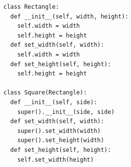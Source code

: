 \documentclass[calcdimensions,landscape,letterpaper]{powersem}
\newcommand{\thecurrentheading}{}
\newcommand{\heading}[1]{\renewcommand{\thecurrentheading}{#1}}
\begin{document}
\begin{slide}
  \heading{Liskov-Substitution - Before}
  \begin{center}
    \begin{verbatim}
class Rectangle:
  def __init__(self, width, height):
    self.width = width
    self.height = height
  def set_width(self, width):
    self.width = width
  def set_height(self, height):
    self.height = height

class Square(Rectangle):
  def __init__(self, side):
    super().__init__(side, side)
  def set_width(self, width):
    super().set_width(width)
    super().set_height(width)
  def set_height(self, height):
    self.set_width(height)
    \end{verbatim}
  \end{center}
\end{slide}
\end{document}

